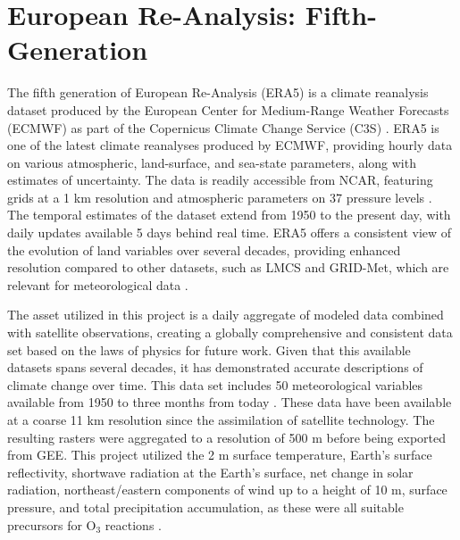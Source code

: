 \section{European Re-Analysis: Fifth-Generation} \label{tmas:era5} The fifth generation of European Re-Analysis (ERA5) is a climate reanalysis dataset produced by the European Center for Medium-Range Weather Forecasts (ECMWF) as part of the Copernicus Climate Change Service (C3S) \parencite{hoffmann2019}. ERA5 is one of the latest climate reanalyses produced by ECMWF, providing hourly data on various atmospheric, land-surface, and sea-state parameters, along with estimates of uncertainty. The data is readily accessible from NCAR, featuring grids at a 1 km resolution and atmospheric parameters on 37 pressure levels \parencite{hersbach2020}. The temporal estimates of the dataset extend from 1950 to the present day, with daily updates available 5 days behind real time. ERA5 offers a consistent view of the evolution of land variables over several decades, providing enhanced resolution compared to other datasets, such as LMCS and GRID-Met, which are relevant for meteorological data \parencite{hersbach2020,munoz-sabater2021,tarek2020}.

The asset utilized in this project is a daily aggregate of modeled data combined with satellite observations, creating a globally comprehensive and consistent data set based on the laws of physics for future work. Given that this available datasets spans several decades, it has demonstrated accurate descriptions of climate change over time. This data set includes 50 meteorological variables available from 1950 to three months from today \parencite{european_centre_for_medium-range_weather_forecasts_era5_2019}. These data have been available at a coarse 11 km resolution since the assimilation of satellite technology. The resulting rasters were aggregated to a resolution of 500 m before being exported from GEE. This project utilized the 2 m surface temperature, Earth's surface reflectivity, shortwave radiation at the Earth's surface, net change in solar radiation, northeast/eastern components of wind up to a height of 10 m, surface pressure, and total precipitation accumulation, as these were all suitable precursors for O$_3$ reactions \parencite{zhang_interaction_2021}. 
